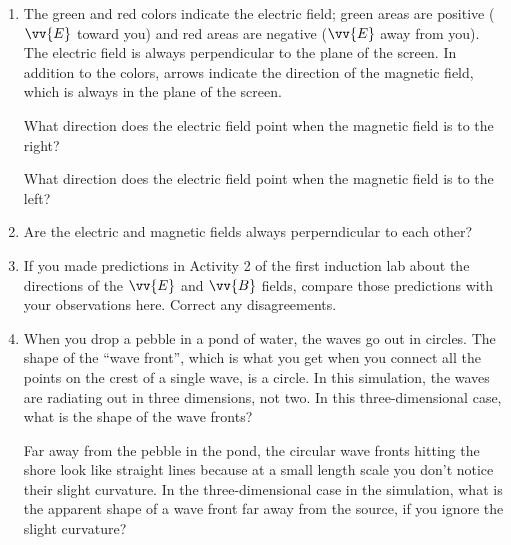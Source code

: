 \begin{enumerate}
\item The green and red colors indicate the electric field; green areas are positive 
($\vv{E}$ toward you) and red areas are negative ($\vv{E}$ away from you). 
The electric field is always perpendicular to the plane of the screen.
In addition to the colors, arrows indicate the 
direction of the magnetic field, which is always in the plane of the screen.  

What direction does the electric field point when the magnetic field is to the right?
\vspace{1cm}

What direction does the electric field point when the magnetic field is to the left?
\vspace{1cm}

\item Are the electric and magnetic fields always perperndicular to each other?
\vspace{1.0cm}


\item If you made predictions in Activity 2 of the first induction lab about the directions of the $\vv {E}$ 
and $\vv {B}$ fields, compare those predictions with your observations here. Correct any disagreements.
\vspace{2.0cm}

\item When you drop a pebble in a pond of water, the waves go out in circles. The shape of the ``wave front'', which is what you get when you connect all the points on the crest of a single wave, is a circle.   In this simulation, the waves are radiating out in three dimensions, not two.  In this three-dimensional case, what is the shape of the wave fronts?
\vspace{1cm}

Far away from the pebble in the pond, the circular wave fronts hitting the shore look like straight lines because at a small length scale you don't notice their slight curvature. In the three-dimensional case in the simulation, what is the apparent shape of a wave front far away from the source, if you ignore the slight curvature?
\vspace{1cm}



\end{enumerate}

